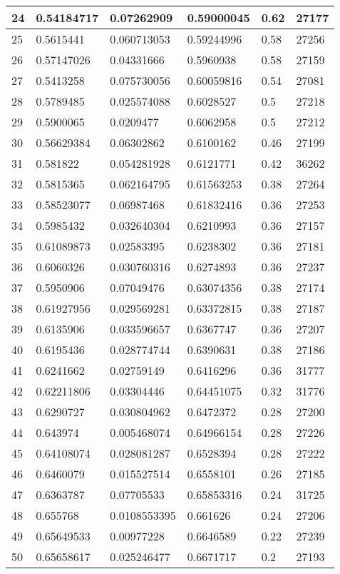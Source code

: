 \begin{longtable}{|l|l|l|l|l|l|}
24 & 0.54184717 & 0.07262909 & 0.59000045 & 0.62 & 27177 \\ \hline 
25 & 0.5615441 & 0.060713053 & 0.59244996 & 0.58 & 27256 \\ \hline 
26 & 0.57147026 & 0.04331666 & 0.5960938 & 0.58 & 27159 \\ \hline 
27 & 0.5413258 & 0.075730056 & 0.60059816 & 0.54 & 27081 \\ \hline 
28 & 0.5789485 & 0.025574088 & 0.6028527 & 0.5 & 27218 \\ \hline 
29 & 0.5900065 & 0.0209477 & 0.6062958 & 0.5 & 27212 \\ \hline 
30 & 0.56629384 & 0.06302862 & 0.6100162 & 0.46 & 27199 \\ \hline 
31 & 0.581822 & 0.054281928 & 0.6121771 & 0.42 & 36262 \\ \hline 
32 & 0.5815365 & 0.062164795 & 0.61563253 & 0.38 & 27264 \\ \hline 
33 & 0.58523077 & 0.06987468 & 0.61832416 & 0.36 & 27253 \\ \hline 
34 & 0.5985432 & 0.032640304 & 0.6210993 & 0.36 & 27157 \\ \hline 
35 & 0.61089873 & 0.02583395 & 0.6238302 & 0.36 & 27181 \\ \hline 
36 & 0.6060326 & 0.030760316 & 0.6274893 & 0.36 & 27237 \\ \hline 
37 & 0.5950906 & 0.07049476 & 0.63074356 & 0.38 & 27174 \\ \hline 
38 & 0.61927956 & 0.029569281 & 0.63372815 & 0.38 & 27187 \\ \hline 
39 & 0.6135906 & 0.033596657 & 0.6367747 & 0.36 & 27207 \\ \hline 
40 & 0.6195436 & 0.028774744 & 0.6390631 & 0.38 & 27186 \\ \hline 
41 & 0.6241662 & 0.02759149 & 0.6416296 & 0.36 & 31777 \\ \hline 
42 & 0.62211806 & 0.03304446 & 0.64451075 & 0.32 & 31776 \\ \hline 
43 & 0.6290727 & 0.030804962 & 0.6472372 & 0.28 & 27200 \\ \hline 
44 & 0.643974 & 0.005468074 & 0.64966154 & 0.28 & 27226 \\ \hline 
45 & 0.64108074 & 0.028081287 & 0.6528394 & 0.28 & 27222 \\ \hline 
46 & 0.6460079 & 0.015527514 & 0.6558101 & 0.26 & 27185 \\ \hline 
47 & 0.6363787 & 0.07705533 & 0.65853316 & 0.24 & 31725 \\ \hline 
48 & 0.655768 & 0.0108553395 & 0.661626 & 0.24 & 27206 \\ \hline 
49 & 0.65649533 & 0.00977228 & 0.6646589 & 0.22 & 27239 \\ \hline 
50 & 0.65658617 & 0.025246477 & 0.6671717 & 0.2 & 27193 \\ \hline 
\end{longtable}